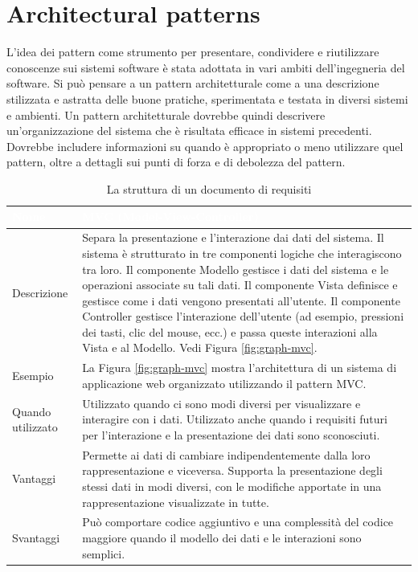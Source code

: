 \section{Architectural patterns}
L'idea dei pattern come strumento per presentare, condividere e riutilizzare conoscenze sui sistemi software è stata adottata in vari ambiti dell'ingegneria del software. Si può pensare a un pattern architetturale come a una descrizione stilizzata e astratta delle buone pratiche, sperimentata e testata in diversi sistemi e ambienti. Un pattern architetturale dovrebbe quindi descrivere un'organizzazione del sistema che è risultata efficace in sistemi precedenti. Dovrebbe includere informazioni su quando è appropriato o meno utilizzare quel pattern, oltre a dettagli sui punti di forza e di debolezza del pattern.

\begin{table}[ht]
\centering
{}
\begin{tabular}{|p{3cm}|p{11.5cm}|}
\hline
\rowcolor{headerblue}
\textbf{\textcolor{white}{Nome}} & \textbf{\textcolor{white}{MVC (Model-View-Controller)}} \\\hline
Descrizione & Separa la presentazione e l'interazione dai dati del sistema. Il sistema è strutturato in tre componenti logiche che interagiscono tra loro. Il componente Modello gestisce i dati del sistema e le operazioni associate su tali dati. Il componente Vista definisce e gestisce come i dati vengono presentati all'utente. Il componente Controller gestisce l'interazione dell'utente (ad esempio, pressioni dei tasti, clic del mouse, ecc.) e passa queste interazioni alla Vista e al Modello. Vedi Figura \ref{fig:graph-mvc}.\\\hline
Esempio & La Figura \ref{fig:graph-mvc} mostra l'architettura di un sistema di applicazione web organizzato utilizzando il pattern MVC.\\\hline
Quando utilizzato & Utilizzato quando ci sono modi diversi per visualizzare e interagire con i dati. Utilizzato anche quando i requisiti futuri per l'interazione e la presentazione dei dati sono sconosciuti.\\\hline
Vantaggi & Permette ai dati di cambiare indipendentemente dalla loro rappresentazione e viceversa. Supporta la presentazione degli stessi dati in modi diversi, con le modifiche apportate in una rappresentazione visualizzate in tutte.\\\hline
Svantaggi & Può comportare codice aggiuntivo e una complessità del codice maggiore quando il modello dei dati e le interazioni sono semplici.
\\\hline
\end{tabular}
\caption{La struttura di un documento di requisiti}
\label{tab:mvc-pattern}
\end{table}

